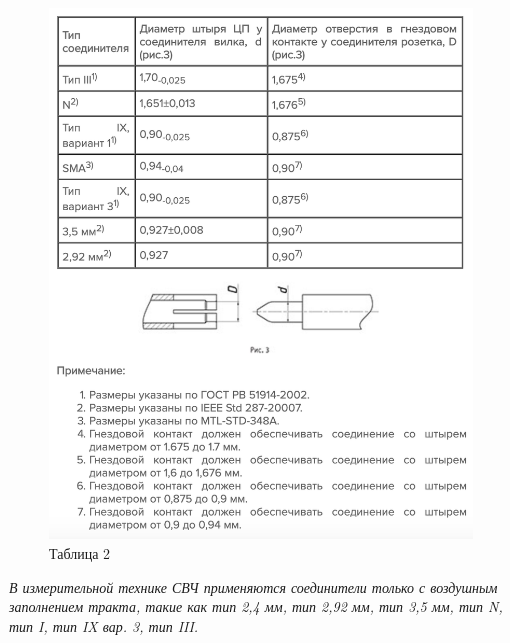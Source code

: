 \documentclass[%
	11pt,
	a4paper,
	utf8,
		]{article}
\begin{document}
\begin{figure}[h]
	\centering
	\includegraphics[scale=0.5]{figures/SVCH_table_2.png}
	\caption{Таблица 2}\label{fig:SVCH_table_2}
\end{figure}

\textit{В измерительной технике СВЧ применяются соединители только с воздушным заполнением тракта, такие как тип 2,4 мм, тип 2,92 мм, тип 3,5 мм, тип N, тип I, тип IX вар. 3, тип III.}
\end{document}
